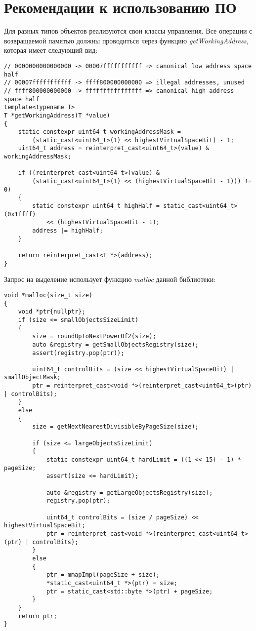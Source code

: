 \section{Рекомендации к использованию ПО}
Для разных типов объектов реализуются свои классы управления. Все операции с возвращаемой памятью должны проводиться через функцию \textit{getWorkingAddress}, которая имеет следующий вид:

\begin{lstlisting}
// 0000000000000000 -> 00007fffffffffff => canonical low address space half
// 00007fffffffffff -> ffff800000000000 => illegal addresses, unused
// ffff800000000000 -> ffffffffffffffff => canonical high address space half
template<typename T>
T *getWorkingAddress(T *value)
{
	static constexpr uint64_t workingAddressMask =
		(static_cast<uint64_t>(1) << highestVirtualSpaceBit) - 1;
	uint64_t address = reinterpret_cast<uint64_t>(value) & workingAddressMask;
	
	if ((reinterpret_cast<uint64_t>(value) &
		(static_cast<uint64_t>(1) << (highestVirtualSpaceBit - 1))) != 0)
	{
		static constexpr uint64_t highHalf = static_cast<uint64_t>(0x1ffff)
			<< (highestVirtualSpaceBit - 1);
		address |= highHalf;
	}
	
	return reinterpret_cast<T *>(address);
}
\end{lstlisting}

Запрос на выделение использует функцию \textit{malloc} данной библиотеки:
\begin{lstlisting}
void *malloc(size_t size)
{
	void *ptr{nullptr};
	if (size <= smallObjectsSizeLimit)
	{
		size = roundUpToNextPowerOf2(size);
		auto &registry = getSmallObjectsRegistry(size);
		assert(registry.pop(ptr));
		
		uint64_t controlBits = (size << highestVirtualSpaceBit) | smallObjectMask;
		ptr = reinterpret_cast<void *>(reinterpret_cast<uint64_t>(ptr) | controlBits);
	}
	else
	{
		size = getNextNearestDivisibleByPageSize(size);
		
		if (size <= largeObjectsSizeLimit)
		{
			static constexpr uint64_t hardLimit = ((1 << 15) - 1) * pageSize;
			assert(size <= hardLimit);
			
			auto &registry = getLargeObjectsRegistry(size);
			registry.pop(ptr);
			
			uint64_t controlBits = (size / pageSize) << highestVirtualSpaceBit;
			ptr = reinterpret_cast<void *>(reinterpret_cast<uint64_t>(ptr) | controlBits);
		}
		else
		{
			ptr = mmapImpl(pageSize + size);
			*static_cast<uint64_t *>(ptr) = size;
			ptr = static_cast<std::byte *>(ptr) + pageSize;
		}
	}
	return ptr;
}
\end{lstlisting}

